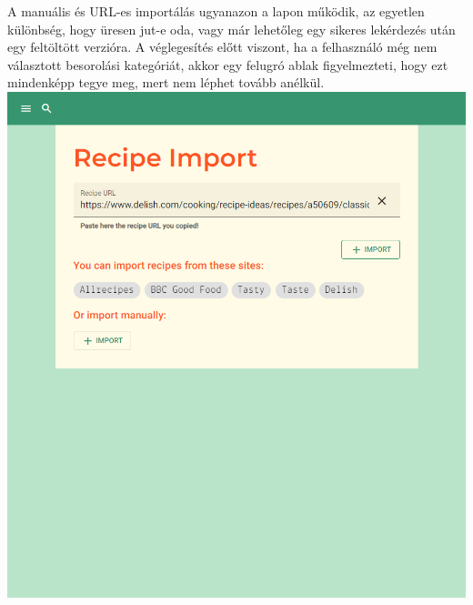 \documentclass[12pt]{report}
\theoremstyle{definition}
\begin{document}
A manuális és URL-es importálás ugyanazon a lapon működik, az egyetlen különbség, hogy üresen jut-e oda, vagy már lehetőleg egy sikeres lekérdezés után egy feltöltött verzióra. A véglegesítés előtt viszont, ha a felhasználó még nem választott besorolási kategóriát, akkor egy felugró ablak figyelmezteti, hogy ezt mindenképp tegye meg, mert nem léphet tovább anélkül.\\

\noindent
\includegraphics[scale=0.4]{pictures/web_import.png}
\end{document}
